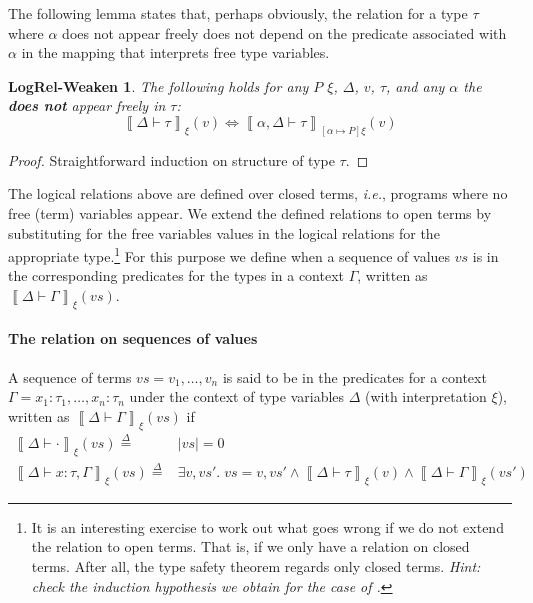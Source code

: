 \documentclass{article}
\newcommand{\ie}{\textit{i.e.}}
\newcommand{\defeq}{\overset{\Delta}{=}}
\newcommand{\pred}{P}
\newcommand{\semtyp}[3]{\left\llbracket #2 \vdash #3 \right\rrbracket_{#1}}
\newcommand{\semenv}{\xi}
\newcommand{\Tctx}{\Gamma}
\newcommand{\CtxTps}{\Delta}
\newcommand{\val}{v}
\newcommand{\var}{x}
\newcommand{\typ}{\tau}
\newcommand{\tvar}{\alpha}
\begin{document}
The following lemma states that, perhaps obviously, the relation for a type $\typ$ where $\tvar$ does not appear freely does not depend on the predicate associated with $\tvar$ in the mapping that interprets free type variables.
\newtheorem*{logrelweaken}{LogRel-Weaken}
\begin{logrelweaken}
  \makeatletter{}\makeatother
  \label{lem:logrelweaken}
  The following holds for any $\pred$ $\semenv$, $\CtxTps$, $\val$, $\typ$, and any $\tvar$ the \textbf{does not} appear freely in $\typ$:
  \[ \semtyp{\semenv}{\CtxTps}{\typ}(\val) \iff \semtyp{[\tvar \mapsto \pred]\semenv}{\tvar, \CtxTps}{\typ}(\val) \]
\end{logrelweaken}
\begin{proof}
Straightforward induction on structure of type $\typ$.
\end{proof}

The logical relations above are defined over closed terms, \ie{}, programs where no free (term) variables appear.
We extend the defined relations to open terms by substituting for the free variables values in the logical relations for the appropriate type.\footnote{It is an interesting exercise to work out what goes wrong if we do not extend the relation to open terms. That is, if we only have a relation on closed terms. After all, the type safety theorem regards only closed terms. \emph{Hint: check the induction hypothesis we obtain for the case of .} }
For this purpose we define when a sequence of values $\mathit{vs}$ is in the corresponding predicates for the types in a context $\Tctx$, written as $\semtyp{\semenv}{\CtxTps}{\Tctx}(\mathit{vs})$.

\paragraph{The relation on sequences of values}
A sequence of terms $\mathit{vs} = \val_1, \dots,\val_n$ is said to be in the predicates for a context $\Tctx = \var_1 : \typ_1,\dots, \var_n : \typ_n$ under the context of type variables $\CtxTps$ (with interpretation $\semenv$), written as $\semtyp{\semenv}{\CtxTps}{\Tctx}(vs)$ if
\begin{align*}
\semtyp{\semenv}{\CtxTps}{\cdot}(\mathit{vs}) \defeq{}& |\mathit{vs}| = 0\\
\semtyp{\semenv}{\CtxTps}{\var : \typ, \Tctx}(\mathit{vs}) \defeq{}& \exists \val, \mathit{vs'}.\; \mathit{vs} = \val, \mathit{vs'} \land \semtyp{\semenv}{\CtxTps}{\typ}(\val) \land \semtyp{\semenv}{\CtxTps}{\Tctx}(\mathit{vs'})
\end{align*}
\end{document}

